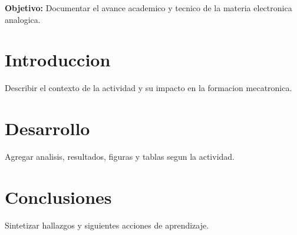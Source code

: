 \documentclass[spanish,letterpaper,oneside]{article}
\begin{document}
\templatePortrait
\templatePagecfg
\onehalfspacing

\begin{abstractd}
\textbf{Objetivo:} Documentar el avance academico y tecnico de la materia electronica analogica.
\end{abstractd}

\templateIndex
\templateFinalcfg

\section{Introduccion}
Describir el contexto de la actividad y su impacto en la formacion mecatronica.

\section{Desarrollo}
Agregar analisis, resultados, figuras y tablas segun la actividad.

\section{Conclusiones}
Sintetizar hallazgos y siguientes acciones de aprendizaje.



\end{document}
